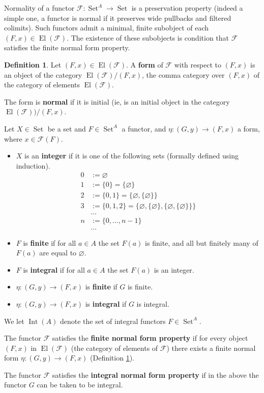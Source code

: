 \documentclass[12pt]{article}
\theoremstyle{plain}
\theoremstyle{definition}
\newtheorem{defn}[thm]{Definition} %
\newcommand{\scr}[1]{\mathscr{#1}}
\newcommand{\lto}{\longrightarrow}
\DeclareMathOperator{\set}{Set}
\begin{document}
 Normality of a functor $\scr{F}: \set^A \lto \set$ is a preservation property (indeed a simple one, a functor is normal if it preserves wide pullbacks and filtered colimits). Such functors admit a minimal, finite subobject of each $(F,x) \in \operatorname{El}(\scr{F})$. The existence of these subobjects is condition that $\scr{F}$ satisfies the finite normal form property.

\begin{defn}\label{def:forms}
		Let $(F,x) \in \operatorname{El}(\scr{F})$. A \textbf{form} of $\scr{F}$ with respect to $(F,x)$ is an object of the category $\operatorname{El}(\scr{F})/(F,x)$, the comma category over $(F,x)$ of the category of elements $\operatorname{El}(\scr{F})$.
		
		The form is \textbf{normal} if it is initial (ie, is an initial object in the category $\operatorname{El}(\scr{F}))/(F,x)$.

  Let $X \in \set$ be a set and $F \in \set^A$ a functor, and $\eta: (G,y) \lto (F,x)$ a form, where $x \in \scr{F}(F)$.
		\begin{itemize}
			\item $X$ is an \textbf{integer} if it is one of the following sets (formally defined using induction).
			\begin{align*}
				0 &:= \varnothing\\
				1 &:= \lbrace 0 \rbrace = \lbrace \varnothing \rbrace\\
				2 &:= \lbrace 0, 1 \rbrace = \big\lbrace \varnothing, \lbrace \varnothing \rbrace \big\rbrace\\
				3 &:= \lbrace 0, 1, 2 \rbrace = \big\lbrace \varnothing, \lbrace \varnothing \rbrace, \lbrace  \varnothing , \lbrace \varnothing \rbrace \rbrace \big\rbrace\\
				&\hdots\\
				n &:= \lbrace 0, \hdots, n-1 \rbrace\\
				&\hdots
			\end{align*}
		\item $F$ is \textbf{finite} if for all $a \in A$ the set $F(a)$ is finite, and all but finitely many of $F(a)$ are equal to $\varnothing$.
		\item $F$ is \textbf{integral} if for all $a \in A$ the set $F(a)$ is an integer.
		\item $\eta: (G,y) \lto (F,x)$ is \textbf{finite} if $G$ is finite.
		\item $\eta: (G,y) \lto (F,x)$ is \textbf{integral} if $G$ is integral.
			\end{itemize}
		We let $\operatorname{Int}(A)$ denote the set of integral functors $F \in \set^A$.

		The functor $\scr{F}$ satisfies the \textbf{finite normal form property} if for every object $(F,x)$ in $\operatorname{El}(\scr{F})$ (the category of elements of $\scr{F}$) there exists a finite normal form $\eta: (G,y) \lto (F,x)$ (Definition \ref{def:forms}).
		
		The functor $\scr{F}$ satisfies the \textbf{integral normal form property} if in the above the functor $G$ can be taken to be integral.
		\end{defn}
	
\end{document}
